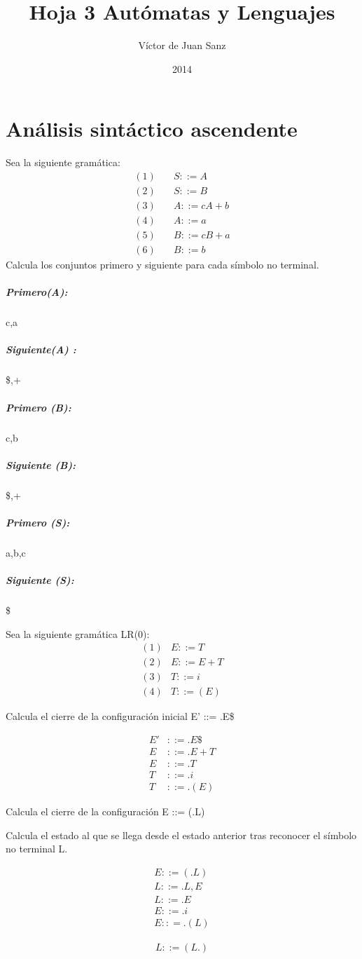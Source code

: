 \documentclass[nochap]{apuntes}
\title{Hoja 3 Autómatas y Lenguajes}
\author{Víctor de Juan Sanz}
\date{2014}
\begin{document}
\maketitle
\section{Análisis sintáctico ascendente}

\begin{problem}[1]
Sea la siguiente gramática:
\begin{align*}
(1)\quad & S ::= A\\
(2)\quad & S ::= B\\
(3)\quad & A ::= cA + b\\
(4)\quad & A ::= a\\
(5)\quad & B ::= cB + a\\
(6)\quad & B ::= b
\end{align*}
Calcula los conjuntos primero y siguiente para cada símbolo no terminal.

\solution

\subparagraph{Primero(A): } {c,a}
\subparagraph{Siguiente(A) : } {\$,+}

\subparagraph{Primero (B):} {c,b}
\subparagraph{Siguiente (B): } {\$,+}

\subparagraph{Primero (S):} {a,b,c}
\subparagraph{Siguiente (S): } {\$}
\end{problem}


\begin{problem}[2]
Sea la siguiente gramática LR(0):
\begin{align*}
(1) & E ::= T\\
(2) & E ::= E + T\\
(3) & T ::= i\\
(4) & T ::= (E)
\end{align*}

Calcula el cierre de la configuración inicial E’ ::= .E\$

\solution
\begin{align*}
E' &::= .E\$\\
E &::= .E + T\\
E &::= .T\\
T &::= .i\\
T &::= .(E)
\end{align*}
\end{problem}


\begin{problem}[3]
\ppart Calcula el cierre de la configuración E ::= (.L)

\ppart Calcula el estado al que se llega desde el estado anterior tras reconocer el símbolo no terminal L.
\solution

\spart
\begin{align*}
E ::= (.L)\\
L ::= .L,E\\
L ::= .E\\
E ::= .i\\
E :: = .(L)
\end{align*}
\spart

\begin{align*}
L ::= (L.)
\end{align*}
\end{problem}
\end{document}
